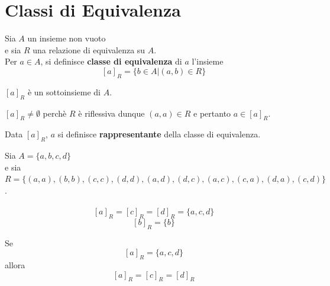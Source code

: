 \documentclass[a4paper,12pt, oneside]{book}
\begin{document}
	\section{Classi di Equivalenza}
	\begin{definizione}
		Sia $A$ un insieme non vuoto\\ e sia $R$ una relazione di equivalenza su $A$.\\
		Per $a \in A$, si definisce \textbf{classe di equivalenza} di $a$ l'insieme $$[a]_{R} = \{b \in A | (a,b) \in R\}$$
	\end{definizione}
	\begin{nota}
		$[a]_{R}$ è un sottoinsieme di $A$.
	\end{nota}
	\begin{nota}
		$[a]_{R} \not = \emptyset$ perchè $R$ è riflessiva dunque $(a,a) \in R$ e pertanto $a \in [a]_{R}$.
	\end{nota}
	\begin{nota}
		Data $[a]_{R}$, $a$ si definisce \textbf{rappresentante} della classe di equivalenza.
	\end{nota}
	\begin{shaded}
		\begin{esempio}
			Sia $A = \{a,b,c,d\}$\\e sia $R=\{(a,a),(b,b),(c,c),(d,d),(a,d),(d,c),(a,c),(c,a),(d,a),(c,d)\}$.\\\\
			$$[a]_{R} = [c]_{R} = [d]_{R}= \{a,c,d\}$$
			$$[b]_{R} = \{b\}$$
		\end{esempio}
		\begin{nota}
			Se $$[a]_{R} = \{a,c,d\}$$ allora $$[a]_{R} = [c]_{R} = [d]_{R}$$
		\end{nota}
	\end{shaded}
\end{document}
